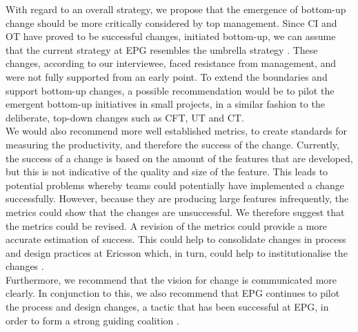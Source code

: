 \documentclass[final_report_innit.tex]{subfiles}
\begin{document}
With regard to an overall strategy, we propose that the emergence of bottom-up change should be more critically considered by top management. Since CI and OT have proved to be successful changes, initiated bottom-up, we can assume that the current strategy at EPG resembles the umbrella strategy \cite{mintzberg1985strategies}. These changes, according to our interviewee, faced resistance from management, and were not fully supported from an early point. To extend the boundaries and support bottom-up changes, a possible recommendation would be to pilot the emergent bottom-up initiatives in small projects, in a similar fashion to the deliberate, top-down changes such as CFT, UT and CT. 
\\

We would also recommend more well established metrics, to create standards for measuring the productivity, and therefore the success of the change. Currently, the success of a change is based on the amount of the features that are developed, but this is not indicative of the quality and size of the feature. This leads to potential problems whereby teams could potentially have implemented a change successfully. However, because they are producing large features infrequently, the metrics could show that the changes are unsuccessful. We therefore suggest that the metrics could be revised. A revision of the metrics could provide a more accurate estimation of success. This could help to consolidate changes in process and design practices at Ericsson which, in turn, could help to institutionalise the changes \cite{kotter1995leading}.
\\

Furthermore, we recommend that the vision for change is communicated more clearly. In conjunction to this, we also recommend that EPG continues to pilot the process and design changes, a tactic that has been successful at EPG, in order to form a strong guiding coalition \cite{kotter1995leading}.
\end{document}
